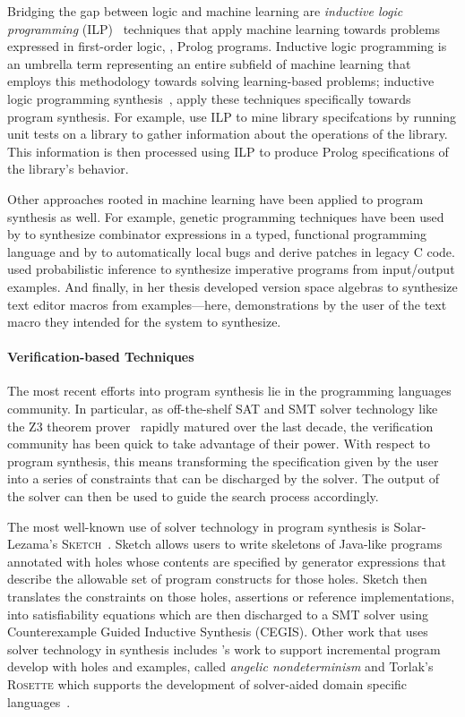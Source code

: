 Bridging the gap between logic and machine learning are \emph{inductive logic programming} (ILP)~\citep{muggleton-jlp-1994} techniques that apply machine learning towards problems expressed in first-order logic, \ie, Prolog programs.
Inductive logic programming is an umbrella term representing an entire subfield of machine learning that employs this methodology towards solving learning-based problems; inductive logic programming synthesis~\citep{flener-jlp-1999}, apply these techniques specifically towards program synthesis.
For example, \citet{sankaranarayanan-icse-2008} use ILP to mine library specifcations by running unit tests on a library to gather information about the operations of the library.
This information is then processed using ILP to produce Prolog specifications of the library's behavior.

Other approaches rooted in machine learning have been applied to program synthesis as well.
For example, genetic programming techniques have been used by \citet{briggs-kes-2008} to synthesize combinator expressions in a typed, functional programming language and by \citet{weimer-icse-2009} to automatically local bugs and derive patches in legacy C code.
\citet{gulwani-popl-2007} used probabilistic inference to synthesize imperative programs from input/output examples.
And finally, \citet{lau-thesis-2001} in her thesis developed version space algebras to synthesize text editor macros from examples---here, demonstrations by the user of the text macro they intended for the system to synthesize.

\paragraph{Verification-based Techniques}

The most recent efforts into program synthesis lie in the programming languages community.
In particular, as off-the-shelf SAT and SMT solver technology like the Z3 theorem prover~\citep{demoura-tacas-2008} rapidly matured over the last decade, the verification community has been quick to take advantage of their power.
With respect to program synthesis, this means transforming the specification given by the user into a series of constraints that can be discharged by the solver.
The output of the solver can then be used to guide the search process accordingly.

The most well-known use of solver technology in program synthesis is Solar-Lezama's \textsc{Sketch}~\citep{solar-lezama-thesis-2008}.
Sketch allows users to write skeletons of Java-like programs annotated with holes whose contents are specified by generator expressions that describe the allowable set of program constructs for those holes.
Sketch then translates the constraints on those holes, \eg assertions or reference implementations, into satisfiability equations which are then discharged to a SMT solver using Counterexample Guided Inductive Synthesis (CEGIS).
Other work that uses solver technology in synthesis includes \citet{bodik-popl-2010}'s work to support incremental program develop with holes and examples, called \emph{angelic nondeterminism} and Torlak's \textsc{Rosette} which supports the development of solver-aided domain specific languages~\citep{torlak-pldi-2014}.

